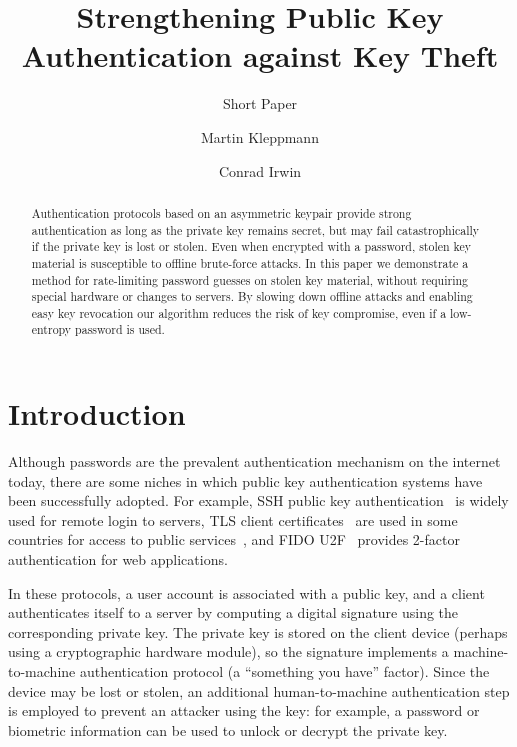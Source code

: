 \documentclass{llncs}
\begin{document}
\title{Strengthening Public Key Authentication against Key Theft}
\subtitle{Short Paper}
\author{Martin Kleppmann \and Conrad Irwin}
\maketitle

\begin{abstract}
Authentication protocols based on an asymmetric keypair provide strong authentication as long as the
private key remains secret, but may fail catastrophically if the private key is lost or stolen. Even
when encrypted with a password, stolen key material is susceptible to offline brute-force attacks.
In this paper we demonstrate a method for rate-limiting password guesses on stolen key material,
without requiring special hardware or changes to servers. By slowing down offline attacks and
enabling easy key revocation our algorithm reduces the risk of key compromise, even if a low-entropy
password is used.
\end{abstract}

\section{Introduction}\label{sec:intro}

Although passwords are the prevalent authentication mechanism on the internet today, there are some
niches in which public key authentication systems have been successfully adopted. For example, SSH
public key authentication~\cite{SSH} is widely used for remote login to servers, TLS client
certificates~\cite{TLS} are used in some countries for access to public services~\cite{Parsovs14},
and FIDO U2F~\cite{FIDOOverview} provides 2-factor authentication for web applications.

In these protocols, a user account is associated with a public key, and a client authenticates
itself to a server by computing a digital signature using the corresponding private key. The private
key is stored on the client device (perhaps using a cryptographic hardware module), so the signature
implements a machine-to-machine authentication protocol (a ``something you have'' factor). Since the
device may be lost or stolen, an additional human-to-machine authentication step is employed to
prevent an attacker using the key: for example, a password or biometric information can be used to
unlock or decrypt the private key.
\end{document}
